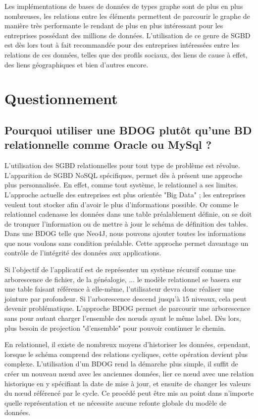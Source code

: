 \documentclass[a4paper,fleqn,12pt]{report}
\begin{document}
Les implémentations de bases de données de types graphe sont de plus en plus nombreuses, les relations entre les éléments permettent de parcourir le graphe de manière très performante le rendant de plus en plus intéressant pour les entreprises possédant des millions de données. L'utilisation de ce genre de SGBD est dès lors tout à fait recommandée pour des entreprises intéressées entre les relations de ces données, telles que des profils sociaux, des liens de cause à effet, des liens géographiques et bien d’autres encore.\cite{infoqSite}\cite{NoSqlDef}\cite{bruchez2016bases}

\section{Questionnement}

\subsection*{Pourquoi utiliser une BDOG plutôt qu'une BD relationnelle comme Oracle ou MySql ?}

L’utilisation des SGBD relationnelles pour tout type de problème est révolue. L’apparition de SGBD NoSQL spécifiques, permet dès à présent une approche plus personnalisée. En effet, comme tout système, le relationnel a ses limites. L’approche actuelle des entreprises est plus orientée "Big Data" ; les entreprises veulent tout stocker afin d’avoir le plus d’informations possible. Or comme le relationnel cadenasse les données dans une table préalablement définie, on se doit de tronquer l’information ou de mettre à jour le schéma de définition des tables. Dans une BDOG telle que Neo4J, nous pouvons ajouter toutes les informations que nous voulons sans condition préalable. Cette approche permet davantage un contrôle de l’intégrité des données aux applications.

Si l’objectif de l’applicatif est de représenter un système récursif comme une arborescence de fichier, de la généalogie, ... le modèle relationnel se basera sur une table faisant référence à elle-même, l’utilisateur devra donc réaliser une jointure par profondeur. Si l’arborescence descend jusqu’à 15 niveaux, cela peut devenir problématique. L’approche BDOG permet de parcourir une arborescence sans pour autant charger l’ensemble des nœuds ayant le même label. Dès lors, plus besoin de projection "d’ensemble" pour pouvoir continuer le chemin.

En relationnel, il existe de nombreux moyens d’historiser les données, cependant, lorsque le schéma comprend des relations cycliques, cette opération devient plus complexe. L’utilisation d’un BDOG rend la démarche plus simple, il suffit de créer un nouveau nœud avec les anciennes données, lier ce nœud avec une relation historique en y spécifiant la date de mise à jour, et ensuite de changer les valeurs du nœud référencé par le cycle. Ce procédé peut être mis au point dans n’importe quelle représentation et ne nécessite aucune refonte globale du modèle de données.\cite{NoSQLVsSGBDR}\label{noSqlVSRel}
\end{document}
